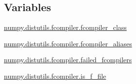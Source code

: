 \subsection*{Variables}
\begin{DoxyCompactItemize}
\item 
\hyperlink{namespacenumpy_1_1distutils_1_1fcompiler_a10d78a3b5dd551718cada03c51f1f7f5}{numpy.\+distutils.\+fcompiler.\+fcompiler\+\_\+class}
\item 
\hyperlink{namespacenumpy_1_1distutils_1_1fcompiler_ad261f13399f3902a16fe8124dc84a522}{numpy.\+distutils.\+fcompiler.\+fcompiler\+\_\+aliases}
\item 
\hyperlink{namespacenumpy_1_1distutils_1_1fcompiler_ad6f1a147de4e8b376414d9ead1e3746f}{numpy.\+distutils.\+fcompiler.\+failed\+\_\+fcompilers}
\item 
\hyperlink{namespacenumpy_1_1distutils_1_1fcompiler_ad09b10411378b0e067548f0df3738dc5}{numpy.\+distutils.\+fcompiler.\+is\+\_\+f\+\_\+file}
\end{DoxyCompactItemize}
